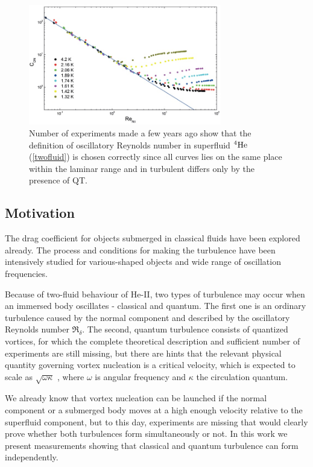\begin{figure}[h]
	\centering
	\includegraphics[width=0.75\textwidth]{graphics/C_Re}
	\caption{Number of experiments made a few years ago show that the definition of oscillatory Reynolds number in superfluid $ {}^4\mathrm{He} $ (\ref{twofluid}) is chosen correctly since all curves lies on the same place within the laminar range and in turbulent differs only by the presence of QT. }
\end{figure}



\subsection*{Motivation}

The drag coefficient for objects submerged in classical fluids have been explored already. The process and conditions for making the turbulence have been intensively studied for various-shaped objects and wide range of oscillation frequencies.
 
Because of two-fluid behaviour of He-II, two types of turbulence may occur when an immersed body oscillates - classical and quantum. The first one is an ordinary turbulence caused by the normal component and described by the oscillatory Reynolds number $ \Re_{\delta} $.
The second, quantum turbulence consists of quantized vortices, for which the complete theoretical description and sufficient number of experiments are still missing, but there are hints that the relevant physical quantity governing vortex nucleation is a critical velocity, which is expected to scale as $\sqrt{\omega \kappa}$ \cite{schoepe}, where $\omega$ is angular frequency and $\kappa$ the circulation quantum.
 
We already know that vortex nucleation can be launched if the normal component or a submerged body moves at a high enough velocity relative to the superfluid component, but to this day, experiments are missing that would clearly prove whether both turbulences form simultaneously or not. In this work we present measurements showing that classical and quantum turbulence can form independently. 